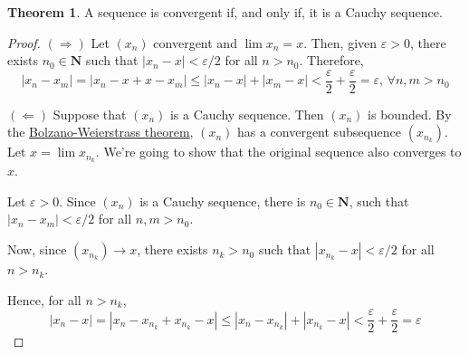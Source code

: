 \documentclass[12pt,a4paper]{article}
\theoremstyle{definition}
\newtheorem{theorem}{Theorem}[section]
\newtheorem{lemma}[theorem]{Lemma}
\begin{document}
%
%  
%
%  
%

\begin{theorem}
	A sequence is convergent if, and only if, it is a Cauchy sequence.
\end{theorem}

\begin{proof}
	$(\Rightarrow)$ Let $(x_n)$ convergent and $\lim x_n = x$. Then, given $\varepsilon > 0$, there exists $n_0 \in \textbf{N}$ such that $|x_n - x| < \varepsilon/2$ for all $n > n_0$. Therefore,
	\[
		|x_n - x_m| = |x_n - x + x - x_m| \leq |x_n - x| + |x_m - x| < \frac{\varepsilon}{2} + \frac{\varepsilon}{2} = \varepsilon, \, \forall n,m > n_0
	\]
	
	$(\Leftarrow)$ Suppose that $(x_n)$ is a Cauchy sequence. Then $(x_n)$ is bounded. By the \hyperref[bolz-weier]{Bolzano-Weierstrass theorem}, $(x_n)$ has a convergent subsequence $(x_{n_k})$. Let $x = \lim x_{n_k}$. We're going to show that the original sequence also converges to $x$.
	
	Let $\varepsilon > 0$. Since $(x_n)$ is a Cauchy sequence, there is $n_0 \in \textbf{N}$, such that $|x_n - x_m| < \varepsilon/2$ for all $n,m > n_0$.
	
	Now, since $(x_{n_k}) \longrightarrow x$, there exists $n_k > n_0$ such that $|x_{n_k} - x| < \varepsilon/2$ for all $n > n_k$.
	
	Hence, for all $n > n_k$, 
	\[
		|x_n - x| = |x_n - x_{n_k} + x_{n_k} - x| \leq |x_n - x_{n_k}| + |x_{n_k} - x| < \frac{\varepsilon}{2} + \frac{\varepsilon}{2} = \varepsilon
	\]
\end{proof}
\end{document}
